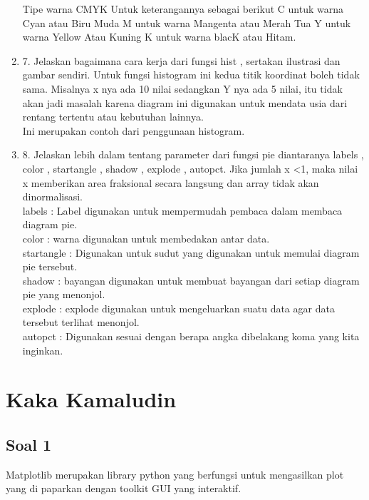 \begin{enumerate}
Tipe warna CMYK
    Untuk keterangannya sebagai berikut
    C untuk warna Cyan atau Biru Muda
    M untuk warna Mangenta atau Merah Tua
    Y untuk warna Yellow Atau Kuning
    K untuk warna blacK atau Hitam.\\

\item 7. Jelaskan bagaimana cara kerja dari fungsi hist , sertakan ilustrasi dan gambar sendiri.
Untuk fungsi histogram ini kedua titik koordinat boleh tidak sama. Misalnya x nya ada 10 nilai sedangkan Y nya ada 5 nilai, itu tidak akan jadi masalah karena diagram ini digunakan untuk mendata usia dari rentang tertentu atau kebutuhan lainnya.\\

Ini merupakan contoh dari penggunaan histogram.\\

\item 8. Jelaskan lebih dalam tentang parameter dari fungsi pie diantaranya labels , color , startangle , shadow , explode , autopct.
Jika jumlah x <1, maka nilai x memberikan area fraksional secara langsung dan array tidak akan dinormalisasi.\\

labels : Label digunakan untuk mempermudah pembaca dalam membaca diagram pie.\\

color : warna digunakan untuk membedakan antar data.\\

startangle : Digunakan untuk sudut yang digunakan untuk memulai diagram pie tersebut.\\

shadow :  bayangan digunakan untuk membuat bayangan dari setiap diagram pie yang menonjol.\\

explode : explode digunakan untuk mengeluarkan suatu data agar data tersebut terlihat menonjol.\\

autopct : Digunakan sesuai dengan berapa angka dibelakang koma yang kita inginkan.\\
\end{enumerate}

\section{Kaka Kamaludin}
\subsection{Soal 1}
Matplotlib merupakan library python yang berfungsi untuk mengasilkan plot yang di paparkan dengan toolkit GUI yang interaktif.

